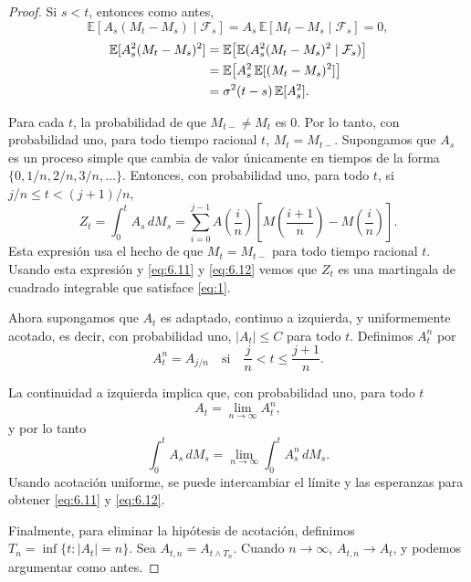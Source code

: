 \documentclass[
marginals=nomargin
]{kaohandt}
\begin{document}
	\begin{proof}
		Si $s < t$, entonces como antes,
		\begin{equation}
			\mathbb{E}[A_s(M_t - M_s) \mid \mathcal{F}_s] = A_s\, \mathbb{E}[M_t - M_s \mid \mathcal{F}_s] = 0,
			\label{eq:6.11}
		\end{equation}
		\begin{align}
			\mathbb{E}[A_s^2(M_t-M_s)^2] &= \mathbb{E}\big[\mathbb{E}(A_s^2(M_t-M_s)^2 \mid \mathcal{F}_s)\big] \notag \\
			&= \mathbb{E}\big[A_s^2\, \mathbb{E}[(M_t-M_s)^2]\big] \notag \\
			&= \sigma^2 (t-s)\, \mathbb{E}[A_s^2]. \label{eq:6.12}
		\end{align}
		
		Para cada $t$, la probabilidad de que $M_{t-} \neq M_t$ es $0$. Por lo tanto, con probabilidad uno, para todo tiempo racional $t$, $M_t = M_{t-}$. Supongamos que $A_s$ es un proceso simple que cambia de valor únicamente en tiempos de la forma $\{0, 1/n, 2/n, 3/n, \ldots\}$. Entonces, con probabilidad uno, para todo $t$, si $j/n \leq t < (j+1)/n$,
		\[
		Z_t = \int_0^t A_s\, dM_s = \sum_{i=0}^{j-1} A\left(\frac{i}{n}\right)\left[M\left(\frac{i+1}{n}\right) - M\left(\frac{i}{n}\right)\right].
		\]
		Esta expresión usa el hecho de que $M_t = M_{t-}$ para todo tiempo racional $t$. Usando esta expresión y \eqref{eq:6.11} y \eqref{eq:6.12} vemos que $Z_t$ es una martingala de cuadrado integrable que satisface \eqref{eq:1}.
		
		Ahora supongamos que $A_t$ es adaptado, continuo a izquierda, y uniformemente acotado, es decir, con probabilidad uno, $|A_t| \leq C$ para todo $t$. Definimos $A_t^n$ por
		\[
		A_t^n = A_{j/n} \quad \text{si} \quad \frac{j}{n} < t \leq \frac{j+1}{n}.
		\]
		
		La continuidad a izquierda implica que, con probabilidad uno, para todo $t$
		\[
		A_t = \lim_{n \to \infty} A_t^n,
		\]
		y por lo tanto
		\[
		\int_0^t A_s\, dM_s = \lim_{n \to \infty} \int_0^t A_s^n\, dM_s.
		\]
		Usando acotación uniforme, se puede intercambiar el límite y las esperanzas para obtener \eqref{eq:6.11} y \eqref{eq:6.12}.
		
		Finalmente, para eliminar la hipótesis de acotación, definimos $T_n = \inf\{t : |A_t| = n\}$. Sea $A_{t,n} = A_{t \wedge T_n}$. Cuando $n \to \infty$, $A_{t,n} \to A_t$, y podemos argumentar como antes.
	\end{proof}
\end{document}
